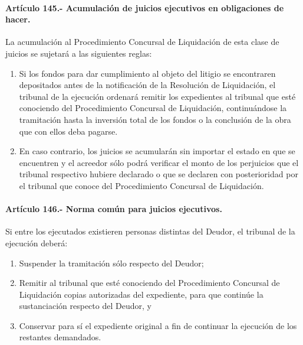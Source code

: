 \documentclass[
]{book}
\begin{document}
\hypertarget{artuxedculo-145.--acumulaciuxf3n-de-juicios-ejecutivos-en-obligaciones-de-hacer.}{%
\paragraph*{Artículo 145.- Acumulación de juicios ejecutivos en obligaciones de hacer.}\label{artuxedculo-145.--acumulaciuxf3n-de-juicios-ejecutivos-en-obligaciones-de-hacer.}}

La acumulación al Procedimiento Concursal de Liquidación de esta clase de juicios se sujetará a las siguientes reglas:

\begin{enumerate}
\def\labelenumi{\arabic{enumi})}
\item
  Si los fondos para dar cumplimiento al objeto del litigio se encontraren depositados antes de la notificación de la Resolución de Liquidación, el tribunal de la ejecución ordenará remitir los expedientes al tribunal que esté conociendo del Procedimiento Concursal de Liquidación, continuándose la tramitación hasta la inversión total de los fondos o la conclusión de la obra que con ellos deba pagarse.
\item
  En caso contrario, los juicios se acumularán sin importar el estado en que se encuentren y el acreedor sólo podrá verificar el monto de los perjuicios que el tribunal respectivo hubiere declarado o que se declaren con posterioridad por el tribunal que conoce del Procedimiento Concursal de Liquidación.
\end{enumerate}

\hypertarget{artuxedculo-146.--norma-comuxfan-para-juicios-ejecutivos.}{%
\paragraph*{Artículo 146.- Norma común para juicios ejecutivos.}\label{artuxedculo-146.--norma-comuxfan-para-juicios-ejecutivos.}}

Si entre los ejecutados existieren personas distintas del Deudor, el tribunal de la ejecución deberá:

\begin{enumerate}
\def\labelenumi{\arabic{enumi})}
\item
  Suspender la tramitación sólo respecto del Deudor;
\item
  Remitir al tribunal que esté conociendo del Procedimiento Concursal de Liquidación copias autorizadas del expediente, para que continúe la sustanciación respecto del Deudor, y
\item
  Conservar para sí el expediente original a fin de continuar la ejecución de los restantes demandados.
\end{enumerate}
\end{document}
